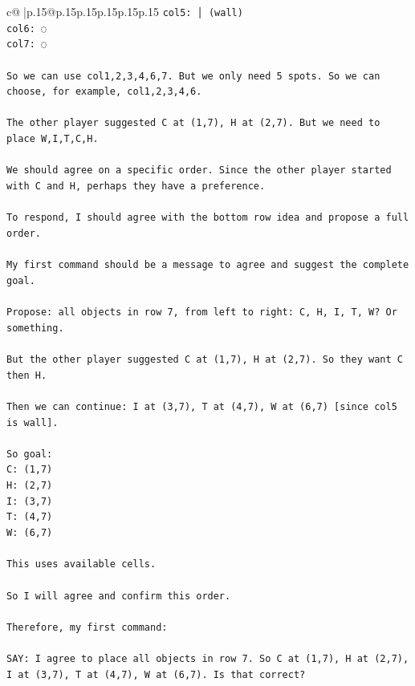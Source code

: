 \documentclass{article}
\begin{document}
{\begin{supertabular}{c@{$\;$}|p{.15\linewidth}@{}p{.15\linewidth}p{.15\linewidth}p{.15\linewidth}p{.15\linewidth}p{.15\linewidth}}
{{{\texttt{col5: │ (wall)} \\
\texttt{col6: ◌} \\
\texttt{col7: ◌} \\
\\ 
\texttt{So we can use col1,2,3,4,6,7. But we only need 5 spots. So we can choose, for example, col1,2,3,4,6.} \\
\\ 
\texttt{The other player suggested C at (1,7), H at (2,7). But we need to place W,I,T,C,H.} \\
\\ 
\texttt{We should agree on a specific order. Since the other player started with C and H, perhaps they have a preference.} \\
\\ 
\texttt{To respond, I should agree with the bottom row idea and propose a full order.} \\
\\ 
\texttt{My first command should be a message to agree and suggest the complete goal.} \\
\\ 
\texttt{Propose: all objects in row 7, from left to right: C, H, I, T, W? Or something.} \\
\\ 
\texttt{But the other player suggested C at (1,7), H at (2,7). So they want C then H.} \\
\\ 
\texttt{Then we can continue: I at (3,7), T at (4,7), W at (6,7) {[}since col5 is wall{]}.} \\
\\ 
\texttt{So goal:} \\
\texttt{C: (1,7)} \\
\texttt{H: (2,7)} \\
\texttt{I: (3,7)} \\
\texttt{T: (4,7)} \\
\texttt{W: (6,7)} \\
\\ 
\texttt{This uses available cells.} \\
\\ 
\texttt{So I will agree and confirm this order.} \\
\\ 
\texttt{Therefore, my first command:} \\
\\ 
\texttt{SAY: I agree to place all objects in row 7. So C at (1,7), H at (2,7), I at (3,7), T at (4,7), W at (6,7). Is that correct?} \\
            }
        }
    }
     \\ \\


\end{supertabular}}
\end{document}
